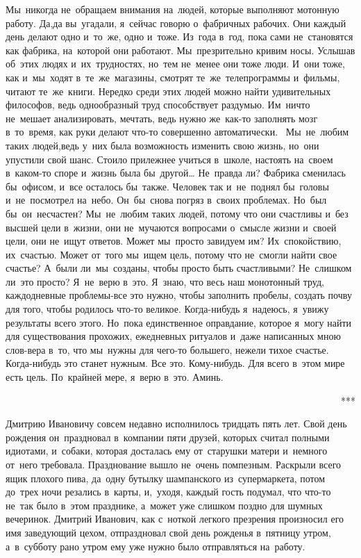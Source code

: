 Мы~никогда не~обращаем внимания на~людей, которые выполняют мотонную работу.
Да,да вы~угадали, я~сейчас говорю о~фабричных рабочих.
Они каждый день делают одно и~то~же, одно и~тоже.
Из~года в~год, пока сами не~становятся как фабрика, на~которой они работают.
Мы~презрительно кривим носы.
Услышав об~этих людях и~их~трудностях, но~тем не~менее они тоже люди.
И~они тоже, как и~мы~ходят в~те~же~магазины, смотрят те~же~телепрограммы и~фильмы, читают те~же~книги.
Нередко среди этих людей можно найти удивительных философов, ведь однообразный труд способствует раздумью.
Им~ничто не~мешает анализировать, мечтать, ведь нужно же~как-то заполнять мозг в~то~время, как руки делают что-то совершенно автоматически.
~Мы~не~любим таких людей,ведь у~них была возможность изменить свою жизнь, но~они упустили свой шанс.
Стоило прилежнее учиться в~школе, настоять на~своем в~каком-то споре и~жизнь была бы~другой… Не~правда ли? Фабрика сменилась бы~офисом, и~все осталось бы~также.
Человек так и~не~поднял бы~головы и~не~посмотрел на~небо.
Он~бы~снова погряз в~своих проблемах.
Но~был бы~он~несчастен? Мы~не~любим таких людей, потому что они счастливы и~без высшей цели в~жизни, они не~мучаются вопросами о~смысле жизни и~своей цели, они не~ищут ответов.
Может мы~просто завидуем им? Их~спокойствию, их~счастью.
Может от~того мы~ищем цель, потому что не~смогли найти свое счастье? А~были ли~мы~созданы, чтобы просто быть счастливыми? Не~слишком ли~это просто? Я~не~верю в~это.
Я~знаю, что весь наш монотонный труд, каждодневные проблемы-все это нужно, чтобы заполнить пробелы, создать почву для того, чтобы родилось что-то великое.
Когда-нибудь я~надеюсь, я~увижу результаты всего этого.
Но~пока единственное оправдание, которое я~могу найти для существования прохожих, ежедневных ритуалов и~даже написанных мною слов-вера в~то, что мы~нужны для чего-то большего, нежели тихое счастье.
Когда-нибудь это станет нужным.
Все это.
Кому-нибудь.
Для всего в~этом мире есть цель.
По~крайней мере, я~верю в~это.
Аминь.
 
~~~~~~~~~~~~~~~~~~~~~~~~~~~~~~~~~~~~~~~~~~~~~~~~~~~~~~~~~~~~~~~~~~~~~***
 
Дмитрию Ивановичу совсем недавно исполнилось тридцать пять лет.
Свой день рождения он~праздновал в~компании пяти друзей, которых считал полными идиотами, и~собаки, которая досталась ему от~старушки матери и~немного от~него требовала.
Празднование вышло не~очень помпезным.
Раскрыли всего ящик плохого пива, да~одну бутылку шампанского из~супермаркета, потом до~трех ночи резались в~карты, и,~уходя, каждый гость подумал, что что-то не~так было в~этом празднике, а~может уже слишком поздно для шумных вечеринок.
Дмитрий Иванович, как с~ноткой легкого презрения произносил его имя заведующий цехом, отпраздновал свой день рожденья в~пятницу утром, а~в~субботу рано утром ему уже нужно было отправляться на~работу.
 

